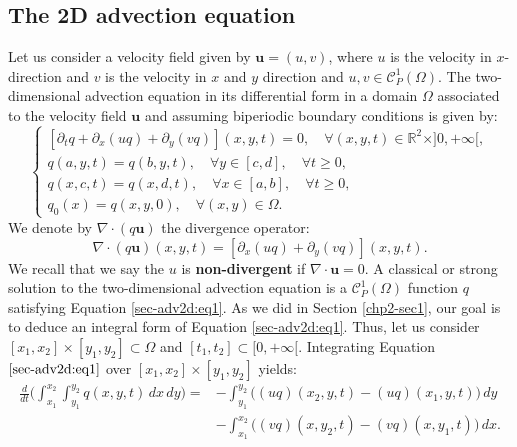 \subsection{The 2D advection equation}
Let us consider a  velocity field given by $\boldsymbol{u}=(u,v)$, where
$u$ is the velocity in $x$-direction and $v$ is the velocity in $x$ and $y$ direction
and $u,v \in \mathcal{C}^1_P(\Omega)$.
The two-dimensional advection equation in its differential form in 
a domain $\Omega$ associated to the velocity field $\boldsymbol{u}$ 
and assuming biperiodic boundary conditions is given by:
\begin{equation}
	\label{sec-adv2d:eq1}
	\begin{cases}
		[{\partial_t q} + {\partial_x (uq)} +  {\partial_y (vq)}](x, y, t)
		= 0, \quad \forall (x,y,t) \in \mathbb{R}^2\times ]0, +\infty[,\\
		{q}(a, y, t) = {q}(b, y, t), \quad \forall y \in [c,d],  \quad \forall t\geq 0, \\
		{q}(x, c, t) = {q}(x, d, t), \quad \forall x \in [a,b],  \quad \forall t\geq 0, \\
		q_0(x) = q(x,y,0), \quad \forall (x,y) \in \Omega.
	\end{cases}
\end{equation}
We denote by $\nabla \cdot (q\boldsymbol{u})$ the divergence operator:
\begin{equation}
	\label{sec-adv2d:eqdiv}
	\nabla \cdot (q\boldsymbol{u})(x, y, t) =  
	[{\partial_x (uq)} + {\partial_y (vq)}](x, y, t).
\end{equation}
We recall that we say the $u$ is \textbf{non-divergent} if $\nabla \cdot \boldsymbol{u}=0$. 
A classical or strong solution to the two-dimensional advection equation is a 
$\mathcal{C}^1_P{(\Omega)}$ function ${q}$ satisfying Equation \eqref{sec-adv2d:eq1}.
As we did in Section \ref{chp2-sec1}, our goal is to deduce an
integral form of Equation \eqref{sec-adv2d:eq1}.
Thus, let us consider  $[x_1,x_2] \times [y_1, y_2]
\subset \Omega$ and $[t_1,t_2] \subset [0, +\infty[$.
Integrating Equation $\eqref{sec-adv2d:eq1}$ over 
$[x_1,x_2] \times [y_1, y_2]$ yields:
\begin{align}
	\label{sec-adv2d:eq2}
	\frac{d}{d t} \bigg(\int_{x_1}^{x_2} \int_{y_1}^{y_2}
	{q}(x, y, t) \,dx \,dy \bigg)=
	&-\int_{y_1}^{y_2} \bigg({(uq)}(x_2, y, t)
	-{(uq)}(x_1, y, t) \bigg) \,dy \\ \nonumber
	&-\int_{x_1}^{x_2} \bigg({(vq)}(x, y_2, t)
	-{(vq)}(x, y_1, t) \bigg) \,dx.
\end{align}
